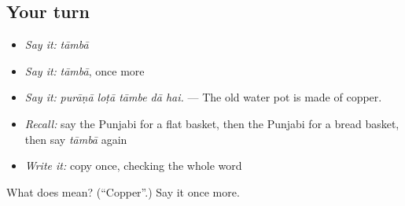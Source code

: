 \subsection*{Your turn}
\begin{itemize}
\raggedright
  \item \emph{Say it:} \emph{tāmbā}
  \item \emph{Say it:} \emph{tāmbā}, once more
  \item \emph{Say it:} \emph{purāṇā loṭā tāmbe dā hai.} — The old water pot is made of copper.
  \item \emph{Recall:} say the Punjabi for a flat basket, then the Punjabi for a bread basket, then say \emph{tāmbā} again
  \item \emph{Write it:} copy \textbf{} once, checking the whole word
\end{itemize}

\begin{tcolorbox}[breakable,colback=teal!4,colframe=teal!35!black,title={Before you move on}]
What does  mean? (\textquotedblleft{}Copper\textquotedblright{}.) Say it once more.
\end{tcolorbox}
